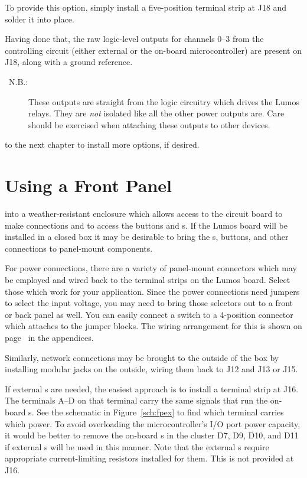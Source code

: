 \documentclass[letterpaper,twoside,onecolumn,openright,final]{memoir}
\begin{document}
To provide this option, simply install a five-position terminal strip at J18 and solder it
into place.

Having done that, the raw logic-level outputs for channels 0--3 from the controlling 
circuit (either external or the on-board microcontroller) are present on J18, along with a ground
reference.

\begin{description}
\item[\HandRight\ N.B.:] These outputs are straight from the logic circuitry which drives the
Lumos relays.  They are \emph{not} isolated like all the other power outputs are.  Care should
be exercised when attaching these outputs to other devices.
\end{description}

\bigskip{} to the next chapter to install more options, if desired.

\chapter{Using a Front Panel}\label{ch:fp}
 into a weather-resistant enclosure which allows access
to the circuit board to make connections and to access the buttons and s.  If the Lumos
board will be installed in a closed box it may be desirable to bring the s, buttons,
and other connections to panel-mount components.

For power connections, there are a variety of panel-mount connectors which may be employed and wired
back to the terminal strips on the Lumos board.  Select those which work for your application.
Since the power connections need jumpers to select the input voltage, you may need to bring those
selectors out to a front or back panel as well.  You can easily connect a  switch
to a 4-position connector which attaches to the jumper blocks.  The wiring arrangement for this 
is shown on page~\pageref{sec:voltagesw} in the appendices.

Similarly, network connections may be brought to the outside of the box by installing modular jacks
on the outside, wiring them back to J12 and J13 or J15. 

If external s are needed, the easiest approach is to install a terminal strip at J16.
The terminals A--D on that terminal carry the same signals that run the on-board s.
See the schematic in Figure~\ref{sch:fpex}
to find which terminal carries which  power.
To avoid overloading the microcontroller's I/O port power capacity, it would be better to remove the
on-board s in the cluster D7, D9, D10, and D11 if external s will be used
in this manner.  Note that the external s require appropriate current-limiting resistors
installed for them.  This is not provided at J16.
\end{document}
